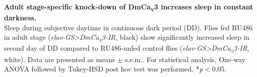 \label{fig:S4}
\textbf{Adult stage-specific knock-down of DmCa\textsubscript{v}3 increases sleep in constant darkness.}
\\
Sleep during subjective daytime in continuous dark period (DD). 
Flies fed RU486 in adult stage (\emph{elav-GS\textgreater{}DmCa\textsubscript{v}3-IR}, black) show significantly increased sleep in second day of DD compared to RU486-unfed control flies (\emph{elav-GS\textgreater{}DmCa\textsubscript{v}3-IR}, white).
Data are presented as means $\pm$ s.e.m..
For statistical analysis, One-way ANOVA followed by Tukey-HSD post hoc test was performed.
*\emph{p}$<$0.05.
  
  